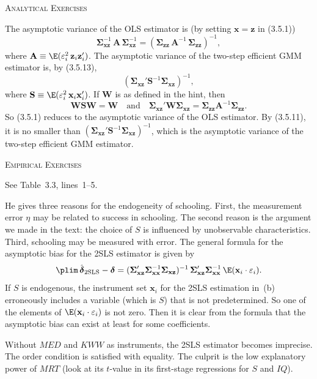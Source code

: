 \begin{answers}

\noindent\textsc{Analytical Exercises}
\bigskip

The asymptotic variance of the OLS estimator is (by setting $\mathbf{x} = \mathbf{z}$ in (3.5.1))
\[
  \boldsymbol{\Sigma}_{\mathbf{xz}}^{-1}\, \mathbf{A}\,
  \boldsymbol{\Sigma}_{\mathbf{xz}}^{-1}
  = (\boldsymbol{\Sigma}_{\mathbf{zz}}\, \mathbf{A}^{-1}\,
  \boldsymbol{\Sigma}_{\mathbf{zz}})^{-1},
\]
where $\mathbf{A} \equiv \E(\varepsilon_i^2\, \mathbf{z}_i \mathbf{z}_i')$.  The asymptotic variance
of the two-step efficient GMM estimator is, by (3.5.13),
\[
  (\boldsymbol{\Sigma}_{\mathbf{xz}}' \mathbf{S}^{-1}
  \boldsymbol{\Sigma}_{\mathbf{xz}})^{-1},
\]
where $\mathbf{S} \equiv \E(\varepsilon_i^2\, \mathbf{x}_i \mathbf{x}_i')$.  If $\mathbf{W}$ is as
defined in the hint, then
\[
  \mathbf{W}\mathbf{S}\mathbf{W} = \mathbf{W} \quad \text{and} \quad
  \boldsymbol{\Sigma}_{\mathbf{xz}}' \mathbf{W} \boldsymbol{\Sigma}_{\mathbf{xz}}
  = \boldsymbol{\Sigma}_{\mathbf{zz}} \mathbf{A}^{-1} \boldsymbol{\Sigma}_{\mathbf{zz}}.
\]
So (3.5.1) reduces to the asymptotic variance of the OLS estimator.  By (3.5.11),
it is no smaller than
$(\boldsymbol{\Sigma}_{\mathbf{xz}}' \mathbf{S}^{-1} \boldsymbol{\Sigma}_{\mathbf{xz}})^{-1}$,
which is the asymptotic variance of the two-step efficient GMM estimator.

\bigskip
\noindent\textsc{Empirical Exercises}
\bigskip

See Table~3.3, lines~1--5.

He gives three reasons for the endogeneity of schooling.  First, the measurement
error $\eta$ may be related to success in schooling.  The second reason is the
argument we made in the text: the choice of $S$ is influenced by unobservable
characteristics.  Third, schooling may be measured with error.  The general
formula for the asymptotic bias for the 2SLS estimator is given by
\[
  \plim\, \hat{\boldsymbol{\delta}}_{\text{2SLS}} - \boldsymbol{\delta}
  = (\boldsymbol{\Sigma}_{\mathbf{xz}}' \boldsymbol{\Sigma}_{\mathbf{xx}}^{-1}
  \boldsymbol{\Sigma}_{\mathbf{xz}})^{-1}\,
  \boldsymbol{\Sigma}_{\mathbf{xz}}' \boldsymbol{\Sigma}_{\mathbf{xx}}^{-1}\,
  \E(\mathbf{x}_i \cdot \varepsilon_i).
\]
If $S$ is endogenous, the instrument set $\mathbf{x}_i$ for the 2SLS estimation in~(b)
erroneously includes a variable (which is $S$) that is not predetermined.  So one of the
elements of $\E(\mathbf{x}_i \cdot \varepsilon_i)$ is not zero.  Then it is clear from the formula that
the asymptotic bias can exist at least for some coefficients.

Without $MED$ and $KWW$ as instruments, the 2SLS estimator becomes imprecise.
The order condition is satisfied with equality.  The culprit is the low
explanatory power of $MRT$ (look at its $t$-value in its first-stage regressions for
$S$ and $IQ$).
\end{answers}
